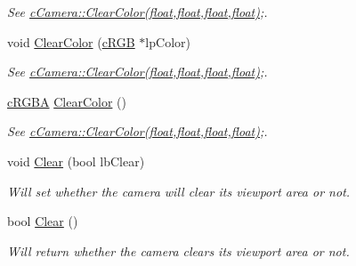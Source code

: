 \begin{DoxyCompactItemize}
\begin{DoxyCompactList}\small\item\em See \hyperlink{classc_viewport_control_ac3cee84c15d6b7bb35daf33a95a41f08}{cCamera::ClearColor(float,float,float,float)};. \end{DoxyCompactList}\item 
\hypertarget{classc_viewport_control_aa5ed9afba3be56e20088734376264c48}{
void \hyperlink{classc_viewport_control_aa5ed9afba3be56e20088734376264c48}{ClearColor} (\hyperlink{classc_r_g_b}{cRGB} $\ast$lpColor)}
\label{classc_viewport_control_aa5ed9afba3be56e20088734376264c48}

\begin{DoxyCompactList}\small\item\em See \hyperlink{classc_viewport_control_ac3cee84c15d6b7bb35daf33a95a41f08}{cCamera::ClearColor(float,float,float,float)};. \end{DoxyCompactList}\item 
\hypertarget{classc_viewport_control_ace2c8b3be8773b37cd4eee63f6e87a45}{
\hyperlink{classc_r_g_b_a}{cRGBA} \hyperlink{classc_viewport_control_ace2c8b3be8773b37cd4eee63f6e87a45}{ClearColor} ()}
\label{classc_viewport_control_ace2c8b3be8773b37cd4eee63f6e87a45}

\begin{DoxyCompactList}\small\item\em See \hyperlink{classc_viewport_control_ac3cee84c15d6b7bb35daf33a95a41f08}{cCamera::ClearColor(float,float,float,float)};. \end{DoxyCompactList}\item 
\hypertarget{classc_viewport_control_a01218f579fdb23ad42c9ba5a76a9fea8}{
void \hyperlink{classc_viewport_control_a01218f579fdb23ad42c9ba5a76a9fea8}{Clear} (bool lbClear)}
\label{classc_viewport_control_a01218f579fdb23ad42c9ba5a76a9fea8}

\begin{DoxyCompactList}\small\item\em Will set whether the camera will clear its viewport area or not. \end{DoxyCompactList}\item 
\hypertarget{classc_viewport_control_a6f4ee4f091f15b472bd651e4a4ef6c88}{
bool \hyperlink{classc_viewport_control_a6f4ee4f091f15b472bd651e4a4ef6c88}{Clear} ()}
\label{classc_viewport_control_a6f4ee4f091f15b472bd651e4a4ef6c88}

\begin{DoxyCompactList}\small\item\em Will return whether the camera clears its viewport area or not. \end{DoxyCompactList}\end{DoxyCompactItemize}


